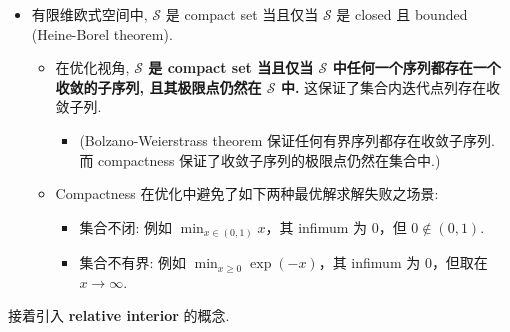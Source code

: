 \documentclass[11pt,UTF8,scheme=plain,fontset=fandol,linespread=1.3]{ctexart}
\numberwithin{figure}{section}
\begin{document}
\begin{itemize}
\item {}有限维欧式空间中, $\mathcal{S}$ 是 compact set 当且仅当 $\mathcal{S}$ 是 closed 且 bounded (Heine-Borel theorem).

\begin{itemize}
\item {}在优化视角, \textbf{$\mathcal{S}$ 是 compact set 当且仅当 $\mathcal{S}$ 中任何一个序列都存在一个收敛的子序列, 且其极限点仍然在 $\mathcal{S}$ 中.} 这保证了集合内迭代点列存在收敛子列.

\begin{itemize}
\item {}(Bolzano-Weierstrass theorem 保证任何有界序列都存在收敛子序列. 而 compactness 保证了收敛子序列的极限点仍然在集合中.)


\end{itemize}


\item {}Compactness 在优化中避免了如下两种最优解求解失败之场景:

\begin{itemize}
\item {}集合不闭: 例如 $\min_{x \in (0,1)} x$，其 infimum 为 $0$，但 $0 \notin (0,1)$.


\item {}集合不有界: 例如 $\min_{x \geq 0} \exp(-x)$，其 infimum 为 $0$，但取在 $x \to \infty$.


\end{itemize}


\end{itemize}


\end{itemize}

接着引入 \textbf{relative interior} 的概念.
\end{document}

